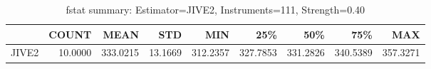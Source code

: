 \begin{table}[ht]
\centering
\caption{fstat summary: Estimator=JIVE2, Instruments=111, Strength=0.40}
\begin{tabular}{lrrrrrrrr}
\toprule
 & COUNT & MEAN & STD & MIN & 25\% & 50\% & 75\% & MAX \\
\midrule
JIVE2 & 10.0000 & 333.0215 & 13.1669 & 312.2357 & 327.7853 & 331.2826 & 340.5389 & 357.3271 \\
\bottomrule
\end{tabular}
\end{table}
